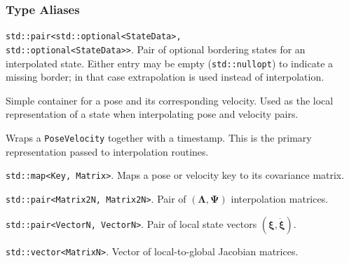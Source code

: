 \documentclass[11pt]{report}
\providecommand{\mbs}[1]{\boldsymbol{#1}}
\begin{document}
\subsubsection*{Type Aliases}
\begin{description}[style=nextline,leftmargin=2em]
	\item[\texttt{StateDataInterval}] \texttt{std::pair<std::optional<StateData>,\\ std::optional<StateData>>}. Pair of optional bordering states for an interpolated state. Either entry may be empty (\texttt{std::nullopt}) to indicate a missing border; in that case extrapolation is used instead of interpolation.
	\item[\texttt{PoseVelocity<PoseType>}] Simple container for a pose and its corresponding velocity. Used as the local representation of a state when interpolating pose and velocity pairs.
	\item[\texttt{TimestampedPoseVelocity<PoseType>}] Wraps a \texttt{PoseVelocity} together with a timestamp. This is the primary representation passed to interpolation routines.
	\item[\texttt{CovarianceMap}] \texttt{std::map<Key, Matrix>}. Maps a pose or velocity key to its covariance matrix.
	\item[\texttt{LambdaPsiMats}] \texttt{std::pair<Matrix2N, Matrix2N>}. Pair of $(\mbs{\Lambda}, \mbs{\Psi})$ interpolation matrices.
	\item[\texttt{LocalStateVecs}] \texttt{std::pair<VectorN, VectorN>}. Pair of local state vectors $(\mbs{\xi}, \dot{\mbs{\xi}})$.
	\item[\texttt{LocalGlobalStateJacs}] \texttt{std::vector<MatrixN>}. Vector of local-to-global Jacobian matrices.
\end{description}
\end{document}
